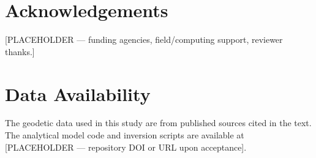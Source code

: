 \documentclass[extra]{gji}
\begin{document}

\section*{Acknowledgements}
[PLACEHOLDER — funding agencies, field/computing support, reviewer thanks.]

\section*{Data Availability}
The geodetic data used in this study are from published sources cited in the
text. The analytical model code and inversion scripts are available at
[PLACEHOLDER — repository DOI or URL upon acceptance].




\label{lastpage}
\end{document}

